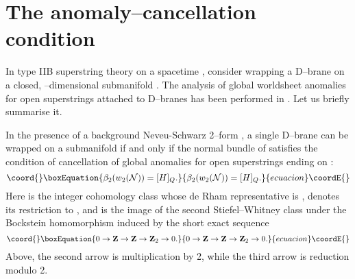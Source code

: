 \documentclass[a4paper,a4paper]{article}
\begin{document}
\section{The anomaly--cancellation condition}\label{ann}  
  
In type IIB superstring theory on a spacetime \coordHE{}, consider wrapping a   
D\coordHE{}--brane on a closed, \coordHE{}--dimensional submanifold \coordHE{}. 
The analysis of global worldsheet anomalies for open superstrings attached 
to D\coordHE{}--branes has been performed in \cite{WITTENDK, FREEDWITTEN, KAPUSTIN}. 
Let us briefly summarise it.  
  
In the presence of a background Neveu-Schwarz 2--form \coordHE{},  
a single D\coordHE{}--brane can be wrapped on a submanifold \coordHE{}  
if and only if the normal bundle \coordHE{} of \coordHE{} satisfies the 
condition of cancellation of global anomalies for open superstrings 
ending on \coordHE{}:   
\begin{equation}\coord{}\boxEquation{  
\beta_2(w_2({\cal N}))=[H]_Q.  
\label{normal}
}{  
\beta_2(w_2({\cal N}))=[H]_Q.  
}{ecuacion}\coordE{}\end{equation}  
Here \myHighlight{$[H]$}\coordHE{} is the integer cohomology class whose de Rham representative is   
\coordHE{}, \coordHE{} denotes its restriction to \coordHE{}, and  
\coordHE{}   
is the image of the second Stiefel--Whitney class \coordHE{}   
under the Bockstein homomorphism \coordHE{}   
induced by the short exact sequence  
\begin{equation}\coord{}\boxEquation{  
0\rightarrow{\bf Z}\rightarrow{\bf Z}\rightarrow{\bf Z}_2\rightarrow 0.  
\label{shortuno}
}{  
0\rightarrow{\bf Z}\rightarrow{\bf Z}\rightarrow{\bf Z}_2\rightarrow 0.  
}{ecuacion}\coordE{}\end{equation}  
Above, the second arrow is multiplication by 2, while the third arrow is   
reduction modulo 2.  
  
\end{document}
